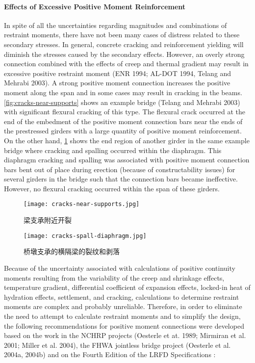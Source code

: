 \paragraph*{Effects of Excessive Positive Moment Reinforcement}
In spite of all the uncertainties regarding magnitudes and combinations of restraint moments, there have not been many cases of distress related to these secondary stresses. In general, concrete cracking and reinforcement yielding will diminish the stresses caused by the secondary effects. However, an overly strong connection combined with the effects of creep and thermal gradient may result in excessive positive restraint moment (ENR 1994; AL-DOT 1994, Telang and Mehrabi 2003). A strong positive moment connection increases the positive moment along the span and in some cases may result in cracking in the beams. \cref{fig:cracks-near-supports} shows an example bridge (Telang and Mehrabi 2003) with significant flexural cracking of this type. The flexural crack occurred at the end of the embedment of the positive moment connection bars near the ends of the prestressed girders with a large quantity of positive moment reinforcement. On the other hand, \cref{fig:cracks-spall-diaphragm} shows the end region of another girder in the same example bridge where cracking and spalling occurred within the diaphragm. This diaphragm cracking and spalling was associated with positive moment connection bars bent out of place during erection (because of constructability issues) for several girders in the bridge such that the connection bars became ineffective. However, no flexural cracking occurred within the span of these girders.

\begin{figure}
  \begin{minipage}{0.5\linewidth}\centering
    \texttt{[image: cracks-near-supports.jpg]}
    \caption{梁支承附近开裂}
    \label{fig:cracks-near-supports}
  \end{minipage}%
  \begin{minipage}{0.5\linewidth}\centering
    \texttt{[image: cracks-spall-diaphragm.jpg]}
    \caption{桥墩支承的横隔梁的裂纹和剥落}
    \label{fig:cracks-spall-diaphragm}
  \end{minipage}
\end{figure}

\bigskip 
Because of the uncertainty associated with calculations of positive continuity moments resulting from the variability of the creep and shrinkage effects, temperature gradient, differential coefficient of expansion effects, locked-in heat of hydration effects, settlement, and cracking, calculations to determine restraint moments are complex and probably unreliable. Therefore, in order to eliminate the need to attempt to calculate restraint moments and to simplify the design, the following recommendations for positive moment connections were developed based on the work in the NCHRP projects (Oesterle et at. 1989; Mirmiran et al. 2001; Miller et al. 2004), the FHWA jointless bridge project (Oesterle et al. 2004a, 2004b) and on the Fourth Edition of the LRFD Specifications \cite{aashto2007l}:


